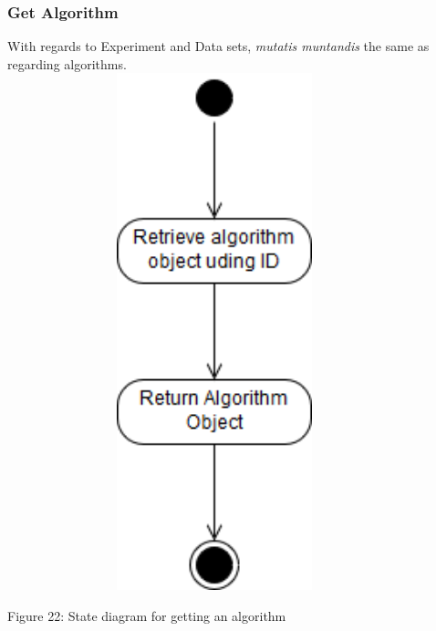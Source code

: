     \subsubsection{Get Algorithm}
    \par With regards to Experiment and Data sets,
    { \textit{mutatis muntandis} the same as regarding algorithms.} \newline \newline
    \includegraphics[width=12cm,height=15cm,keepaspectratio]{input_unit/images/get_algorithm_state_diagram.png}
    \begin{center}
    	\small{Figure 22: State diagram for getting an algorithm }
    \end{center}
    \newpage
